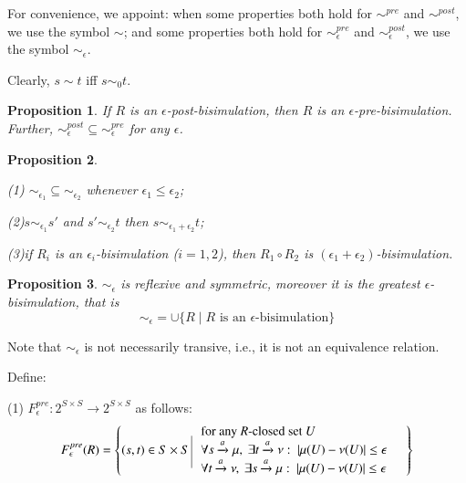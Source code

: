\documentclass[contract,10pt]{elsarticle}
\newtheorem{prop}{Proposition}
\newenvironment{proposition}{\begin{prop} \rm }{\end{prop}}
\newcommand{\R}[1]{{\color{red}   #1}}
\begin{document}
For convenience, we appoint: when some properties  both hold for $\sim^{pre}$ and $\sim^{post}$, we use the symbol $\sim $; and some properties both hold for $\sim^{pre}_{\epsilon}$ and $\sim^{post}_{\epsilon}$, we use the symbol
$\sim_{\epsilon}$.

Clearly, $s\sim t$ iff $s\sim_{0} t$.

\begin{proposition}  If $R$ is  an $\epsilon$-post-bisimulation, then $R$ is  an $\epsilon$-pre-bisimulation. Further, $\sim^{post}_{\epsilon}\subseteq \sim^{pre}_{\epsilon}$ for any $\epsilon$.
\end{proposition}

\begin{proposition}\label{property}

 (1) $\sim_{\epsilon_1}\subseteq \sim_{\epsilon_2} $ whenever $\epsilon_1\leq \epsilon_2$;

 (2)$s\sim_{\epsilon_1} s'$ and $s'\sim_{\epsilon_2} t$ then $s\sim_{\epsilon_1+\epsilon_2} t$;

 (3)if $R_i$ is an $\epsilon_i$-bisimulation ($i=1,2$), then $R_1\circ R_2$ is $(\epsilon_1+\epsilon_2)$-bisimulation.

\end{proposition}

\begin{proposition}  $\sim_{\epsilon}$ is reflexive and symmetric, moreover it is the greatest $\epsilon$-bisimulation, that is
$$
\sim_{\epsilon}=\cup\{R\mid \mbox{$R$ is an $\epsilon$-bisimulation}\}
$$
\end{proposition}

\R {Note that $\sim_{\epsilon}$ is not necessarily transive, i.e., it is not an equivalence relation. }


Define:

(1) $F^{pre}_{\epsilon}:2^{S\times S}\rightarrow 2^{S\times S}$ as follows:
 \label{eq:defF}
$$F^{pre}_{\epsilon}(R)=\left\{(s,t)\in S\times S \put(2,-11){\line(0,1){25.0}}
\hspace{-0.2cm}\begin{array}{lll} &\mbox{for any $R$-closed set $U$}&\\
&\forall s\xrightarrow{a} \mu,~\exists t\xrightarrow{a}\nu:~ |\mu(U)-\nu(U)|\leq \epsilon&\\
&\forall t\xrightarrow{a} \nu,~\exists s\xrightarrow{a}\mu:~ |\mu(U)-\nu(U)|\leq \epsilon&\\
\end{array}
\right\}
$$
\end{document}
